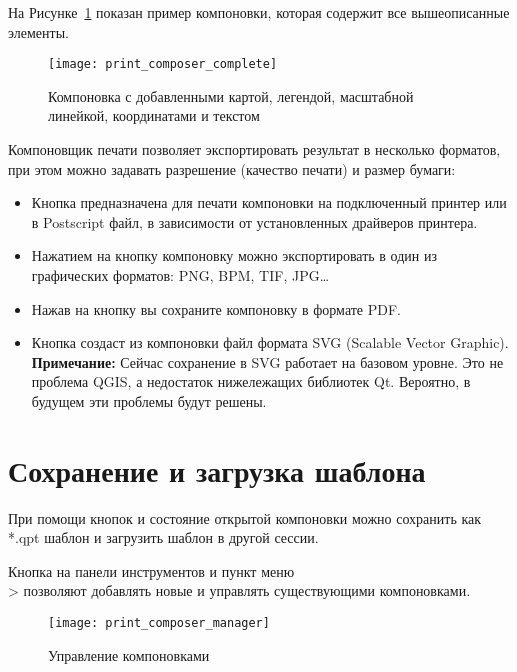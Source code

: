 На Рисунке~\ref{fig:print_composer_complete} показан пример компоновки,
которая содержит все вышеописанные элементы.

\begin{figure}[h]
   \centering
   \texttt{[image: print\_composer\_complete]}
   \caption{Компоновка с добавленными картой, легендой, масштабной линейкой, координатами и текстом \nixcaption} \label{fig:print_composer_complete}
\end{figure}

Компоновщик печати позволяет экспортировать результат в несколько
форматов, при этом можно задавать разрешение (качество печати) и размер
бумаги:

\begin{itemize}[label=--]
\item Кнопка  предназначена для
печати компоновки на подключенный принтер или в Postscript файл, в
зависимости от установленных драйверов принтера.
\item Нажатием на кнопку
компоновку можно экспортировать в один из графических форматов: PNG,
BPM, TIF, JPG\dots
\item Нажав на кнопку  вы
сохраните компоновку в формате PDF.
\item Кнопка  создаст из
компоновки файл формата SVG (Scalable Vector Graphic).
\textbf{Примечание:} Сейчас сохранение в SVG работает на базовом уровне.
Это не проблема QGIS, а недостаток нижележащих библиотек Qt. Вероятно,
в будущем эти проблемы будут решены.
\end{itemize}

\section{Сохранение и загрузка шаблона}

При помощи кнопок 
и  состояние открытой
компоновки можно сохранить как *.qpt шаблон и загрузить шаблон в другой
сессии.

Кнопка 
на панели инструментов и пункт меню \\
 > 
позволяют добавлять новые и управлять существующими компоновками.

\begin{figure}[h]
   \centering
   \texttt{[image: print\_composer\_manager]}
   \caption{Управление компоновками \nixcaption}
   \label{fig:print_composer_manager}
\end{figure}

\FloatBarrier

